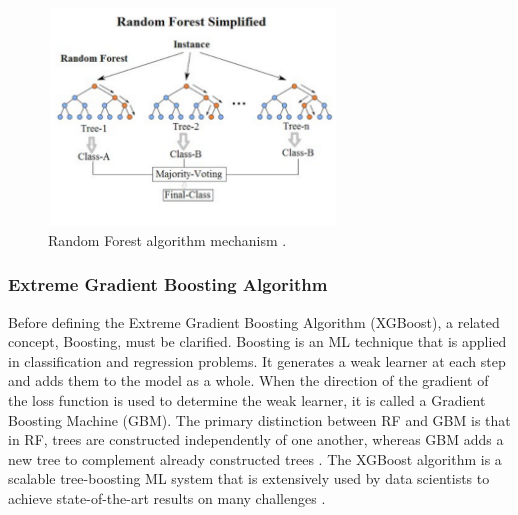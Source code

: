 \documentclass[12pt]{diazessay}
\begin{document}
    \begin{figure}[H]
        \centering
        \includegraphics[width=7.7cm]{Figures/Random_forest_diagram_complete.png}
        \caption[Random Forest algorithm mechanism]{Random Forest algorithm mechanism \cite{azhari2019adaptation}.}
        \label{fig:Random-Forest}
    \end{figure}
    
    \subsubsection{Extreme Gradient Boosting Algorithm}
 
    \hspace{0.7cm} Before defining the Extreme Gradient Boosting Algorithm (XGBoost), a related concept, Boosting, must be clarified. Boosting is an ML technique that is applied in classification and regression problems. It generates a weak learner at each step and adds them to the model as a whole. When the direction of the gradient of the loss function is used to determine the weak learner, it is called a Gradient Boosting Machine (GBM). The primary distinction between RF and GBM is that in RF, trees are constructed independently of one another, whereas GBM adds a new tree to complement already constructed trees \cite{pan2018application}. The XGBoost algorithm is a scalable tree-boosting ML system \cite{pan2018application} that is extensively used by data scientists to achieve state-of-the-art results on many challenges \cite{chen2016xgboost}.
\end{document}
